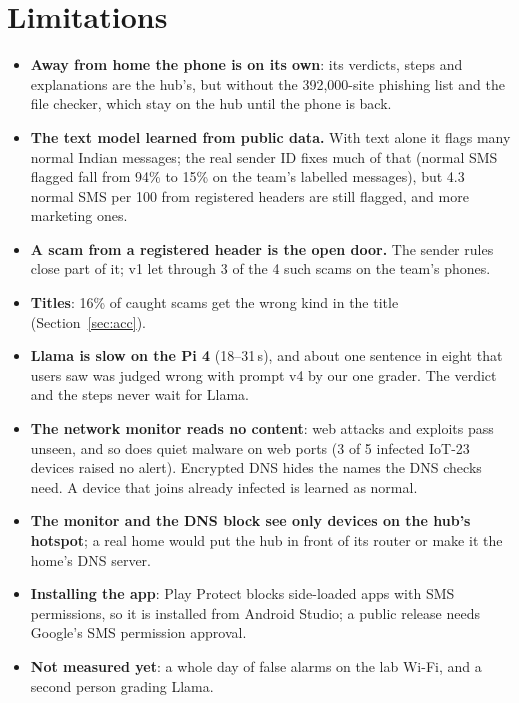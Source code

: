 \documentclass[11pt,a4paper]{article}
\begin{document}
\section{Limitations}
\label{sec:limits}

\begin{itemize}
  \item \textbf{Away from home the phone is on its own}: its verdicts, steps and explanations are the hub's, but without
        the 392,000-site phishing list and the file checker, which stay on the hub until the phone is back.
  \item \textbf{The text model learned from public data.} With text alone it flags many normal Indian messages; the real
        sender ID fixes much of that (normal SMS flagged fall from 94\% to 15\% on the team's labelled messages), but 4.3
        normal SMS per 100 from registered headers are still flagged, and more marketing ones.
  \item \textbf{A scam from a registered header is the open door.} The sender rules close part of it; v1 let through 3 of
        the 4 such scams on the team's phones.
  \item \textbf{Titles}: 16\% of caught scams get the wrong kind in the title (Section~\ref{sec:acc}).
  \item \textbf{Llama is slow on the Pi 4} (18--31\,s), and about one sentence in eight that users saw was judged wrong
        with prompt v4 by our one grader. The verdict and the steps never wait for Llama.
  \item \textbf{The network monitor reads no content}: web attacks and exploits pass unseen, and so does quiet malware on
        web ports (3 of 5 infected IoT-23 devices raised no alert). Encrypted DNS hides the names the DNS checks need.
        A device that joins already infected is learned as normal.
  \item \textbf{The monitor and the DNS block see only devices on the hub's hotspot}; a real home would put the hub in
        front of its router or make it the home's DNS server.
  \item \textbf{Installing the app}: Play Protect blocks side-loaded apps with SMS permissions, so it is installed from
        Android Studio; a public release needs Google's SMS permission approval.
  \item \textbf{Not measured yet}: a whole day of false alarms on the lab Wi-Fi, and a second person grading Llama.
\end{itemize}
\end{document}
